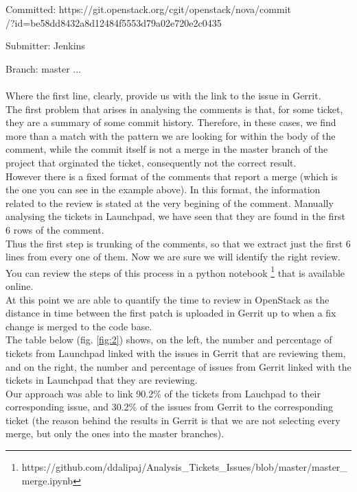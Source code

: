 \documentclass[ifip]{svmult}
\begin{document}
Committed: https://git.openstack.org/cgit/openstack/nova/commit
\\
/?id=be58dd8432a8d12484f5553d79a02e720e2c0435

Submitter: Jenkins

Branch:    master ...
\\
\\
Where the first line, clearly, provide us with the link to the issue in Gerrit. 
\\
The first problem that arises in analysing the comments is that, for some ticket, they are a summary of some commit history. 
Therefore, in these cases, we find more than a match with the pattern we are looking for within the body of 
the comment, while the commit itself is not a merge in the master branch of the project that orginated the ticket, 
consequently not the correct result. 
\\
However there is a fixed format of the comments that report a merge (which is the one you can see in the example above).
In this format, the information related to the review is stated at the very begining of the 
comment. Manually analysing the tickets in Launchpad, we have seen that they are found in the first 6 rows of the comment.
\\
Thus the first step is trunking of the comments, so that we extract just the first 6 lines from every one of them. 
Now we are sure we will identify the right review. 
\\
You can review the steps of this process in a python notebook
\footnote{https://github.com/ddalipaj/Analysis\_Tickets\_Issues/blob/master/master\_merge.ipynb}
that is available online. 
\\
At this point we are able to quantify the time to review in OpenStack as the distance in time between the first patch is 
uploaded in Gerrit up to when a fix change is merged to the code base.
\\
The table below (fig. \ref{fig:2}) shows, on the left, the number and percentage of tickets from Launchpad linked with the issues 
in Gerrit that are reviewing them, and on the right, the number and percentage of issues from Gerrit linked with the tickets in 
Launchpad that they are reviewing. 
\\
Our approach was able to link 90.2\% of the tickets from Lauchpad to their corresponding issue, 
and 30.2\% of the issues from Gerrit to the corresponding ticket (the reason behind the results in Gerrit 
is that we are not selecting every merge, but only the ones 
into the master branches).
\end{document}
